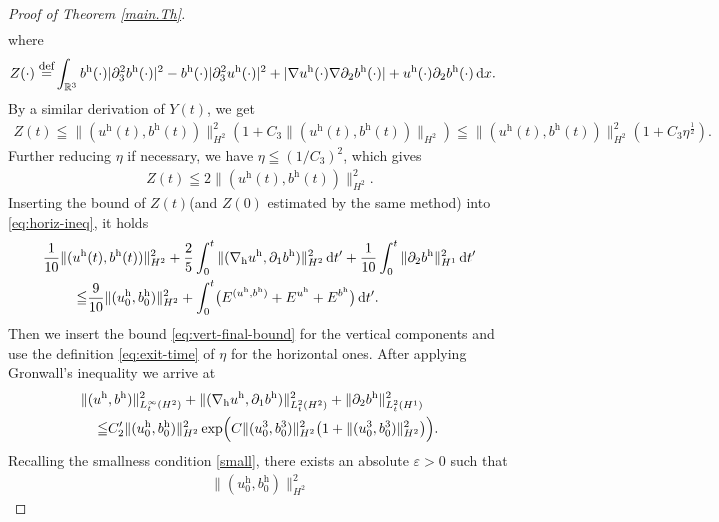 \documentclass[11pt]{amsart}
\theoremstyle{definition}
\newcommand{\R}{\mathbb{R}}
\def\eqdefa{\buildrel\hbox{\footnotesize def}\over =}
\newcommand{\dx}{\,{\rm d}x}
\newcommand{\dt}{\,{\rm d}t}
\numberwithin{equation}{section}
\begin{document}
\begin{proof}[Proof of Theorem \ref{main.Th}]
\begin{align}
	\end{align}
	where
	\begin{align*}
		Z(\cdot)\eqdefa& \int_{\R^3} b^\mathrm{h} (\cdot)|\partial_3^2b^\mathrm{h} (\cdot)|^2-b^\mathrm{h} (\cdot)|\partial_3^2u^\mathrm{h} (\cdot)|^2+|\nabla u^\mathrm{h} (\cdot)\nabla\partial_{2}b^\mathrm{h} (\cdot)|+ u^\mathrm{h} (\cdot)\partial_2 b^\mathrm{h} (\cdot)\dx.
	\end{align*}
	By a similar derivation of $Y(t)$, we get
	\begin{align*}
		Z(t)\leqq \|(u^\mathrm{h}(t),b^\mathrm{h}(t))\|_{H^2}^2(1+C_3\|(u^\mathrm{h}(t),b^\mathrm{h}(t))\|_{H^2})\leqq \|(u^\mathrm{h}(t),b^\mathrm{h}(t))\|_{H^2}^2(1+C_3\eta^\frac12).
	\end{align*}
	Further reducing $\eta$ if necessary, we have $\eta\leqq (1/C_3)^2$, which gives
	\begin{align*}
		Z(t)\leqq2 \|(u^\mathrm{h}(t),b^\mathrm{h}(t))\|_{H^2}^2.
	\end{align*}
	Inserting the bound of $Z(t)$(and $Z(0)$ estimated by the same method) into \eqref{eq:horiz-ineq}, it holds
	\begin{align*}
		\frac{1}{10}\|(u^\mathrm{h}&(t),b^\mathrm{h}(t))\|^2_{H^2}+\frac{2}{5}\int_{0}^{t}\|(\nabla_{\mathrm{h}} u^\mathrm{h},\partial_1b^\mathrm{h})\|_{H^2}^2\dt'+\frac{1}{10}\int_{0}^{t}\|\partial_2 b^\mathrm{h}\|_{H^1}^2\dt'\\
		\leqq & \frac{9}{10}\|(u^\mathrm{h}_0,b^\mathrm{h}_0)\|^2_{H^2}
		+\int_{0}^{t}\bigl(E^{(u^\mathrm{h},b^\mathrm{h})}+E^{u^\mathrm{h}}+E^{b^\mathrm{h}}\bigr)\dt'.
	\end{align*}
	Then we insert the bound \eqref{eq:vert-final-bound} for the vertical components and use the definition \eqref{eq:exit-time} of $\eta$ for the horizontal ones. After applying Gronwall's inequality we arrive at
	\begin{align}\label{eq:horiz-final-bound}
		\|(u^\mathrm{h}&,b^\mathrm{h})\|^2_{L_{t}^{\infty}(H^2)}+\|(\nabla_{\mathrm{h}} u^\mathrm{h},\partial_1b^\mathrm{h})\|_{L_{t}^{2}(H^2)}^2+\|\partial_2b^\mathrm{h}\|_{L_{t}^{2}(H^1)}^2\nonumber\\
		\leqq& C_2'\|(u^\mathrm{h}_0,b^\mathrm{h}_0)\|^2_{H^2}
		\exp\Bigl(C\|(u^3_0,b^3_0)\|^2_{H^2}\bigl(1+\|(u^3_0,b^3_0)\|^2_{H^2}\bigr)\Bigr).
	\end{align}
	Recalling the smallness condition \eqref{small}, there exists an absolute $\varepsilon>0$ such that
	\begin{align*}
		\|(u^\mathrm{h}_0,b^\mathrm{h}_0)\|_{H^2}^2

\end{align*}
\end{proof}
\end{document}
